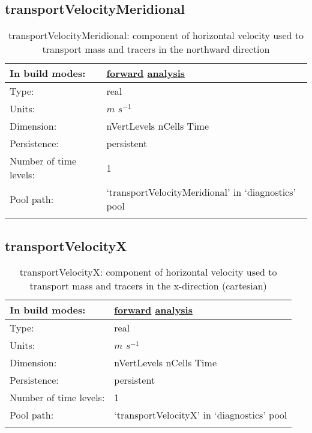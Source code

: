 \subsection[transportVelocityMeridional]{transportVelocityMeridional}
\label{subsec:var_sec_diagnostics_transportVelocityMeridional}
\begin{center}
\begin{longtable}{| p{2.0in} | p{4.0in} |}
        \hline 
        In build modes: & \hyperref[subsec:forward_var_tab_diagnostics]{forward} \hyperref[subsec:analysis_var_tab_diagnostics]{analysis} \\
        \hline 
        Type: & real \\
        \hline 
        Units: & $m$ $s^{-1}$ \\
        \hline 
        Dimension: & nVertLevels nCells Time \\
        \hline 
        Persistence: & persistent \\
        \hline 
        Number of time levels: & 1 \\
        \hline 
            Pool path: & `transportVelocityMeridional' in `diagnostics' pool \\
		 \hline 
    \caption{transportVelocityMeridional: component of horizontal velocity used to transport mass and tracers in the northward direction}
\end{longtable}
\end{center}
\subsection[transportVelocityX]{transportVelocityX}
\label{subsec:var_sec_diagnostics_transportVelocityX}
\begin{center}
\begin{longtable}{| p{2.0in} | p{4.0in} |}
        \hline 
        In build modes: & \hyperref[subsec:forward_var_tab_diagnostics]{forward} \hyperref[subsec:analysis_var_tab_diagnostics]{analysis} \\
        \hline 
        Type: & real \\
        \hline 
        Units: & $m$ $s^{-1}$ \\
        \hline 
        Dimension: & nVertLevels nCells Time \\
        \hline 
        Persistence: & persistent \\
        \hline 
        Number of time levels: & 1 \\
        \hline 
            Pool path: & `transportVelocityX' in `diagnostics' pool \\
		 \hline 
    \caption{transportVelocityX: component of horizontal velocity used to transport mass and tracers in the x-direction (cartesian)}
\end{longtable}
\end{center}
